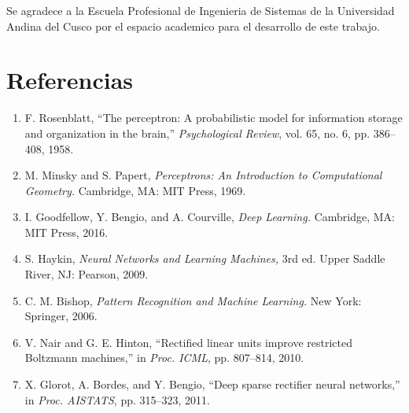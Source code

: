 \documentclass[10pt,twocolumn,a4paper]{article}
\begin{document}
Se agradece a la Escuela Profesional de Ingenieria de Sistemas de la
Universidad Andina del Cusco por el espacio academico para el
desarrollo de este trabajo.

\section*{Referencias}
\begingroup
\small
\begin{enumerate}
\setlength{\itemsep}{0pt}
\setlength{\parsep}{0pt}

\item F. Rosenblatt, ``The perceptron: A probabilistic model for
  information storage and organization in the brain,''
  \textit{Psychological Review}, vol. 65, no. 6, pp. 386--408, 1958.

\item M. Minsky and S. Papert, \textit{Perceptrons: An Introduction
  to Computational Geometry.} Cambridge, MA: MIT Press, 1969.

\item I. Goodfellow, Y. Bengio, and A. Courville,
  \textit{Deep Learning.} Cambridge, MA: MIT Press, 2016.

\item S. Haykin, \textit{Neural Networks and Learning Machines,}
  3rd ed. Upper Saddle River, NJ: Pearson, 2009.

\item C. M. Bishop, \textit{Pattern Recognition and Machine
  Learning.} New York: Springer, 2006.

\item V. Nair and G. E. Hinton, ``Rectified linear units improve
  restricted Boltzmann machines,'' in \textit{Proc. ICML},
  pp. 807--814, 2010.

\item X. Glorot, A. Bordes, and Y. Bengio, ``Deep sparse rectifier
  neural networks,'' in \textit{Proc. AISTATS},
  pp. 315--323, 2011.

\end{enumerate}
\endgroup
\end{document}
